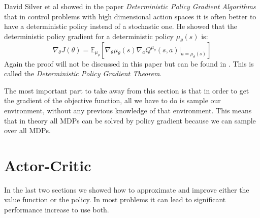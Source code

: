 David Silver et al showed in the paper \emph{Deterministic Policy Gradient Algorithms} that in control problems with high dimensional action spaces it is often better to have a deterministic policy instead of a stochastic one.
He showed that the deterministic policy gradient for a deterministic policy $\mu_{\theta}(s)$ is:
\begin{equation} \label{eq:d_p_g_theorem}
	\nabla_{\theta}J(\theta) = \mathbb{E}_{\mu_{\theta}}[\nabla_{\theta}\mu_{\theta}(s)\nabla_{a}Q^{\mu_{\theta}}(s,a)|_{a=\mu_{\theta}(s)}]
\end{equation}
Again the proof will not be discussed in this paper but can be found in \cite{policy_gradient_silver}.
This is called the \emph{Deterministic Policy Gradient Theorem}.


The most important part to take away from this section is that in order to get the gradient of the objective function, all we have to do is sample our environment, without any previous knowledge of that environment.
This means that in theory all MDPs can be solved by policy gradient because we can sample over all MDPs.


\section{Actor-Critic}
\label{actor_critic}

In the last two sections we showed how to approximate and improve either the value function or the policy.
In most problems it can lead to significant performance increase to use both.

\begin{center}
\label{fig:actor-critic}
\end{center}

